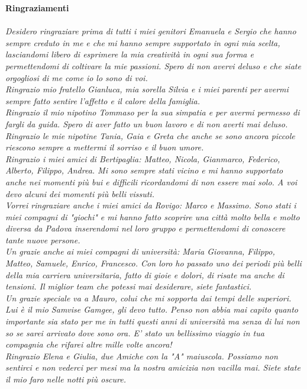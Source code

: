 \thispagestyle{empty}
\textbf{Ringraziamenti}\\\\
\textit{
Desidero ringraziare prima di tutti i miei genitori Emanuela e Sergio che hanno sempre creduto in me e che mi hanno sempre supportato in ogni mia scelta, lasciandomi libero di esprimere la mia creativit\`a in ogni sua forma e permettendomi di coltivare la mie passioni. Spero di non avervi deluso e che siate orgogliosi di me come io lo sono di voi.
\\
Ringrazio mio fratello Gianluca, mia sorella Silvia e i miei parenti per avermi sempre fatto sentire l'affetto e il calore della famiglia.
\\
Ringrazio il mio nipotino Tommaso per la sua simpatia e per avermi permesso di fargli da guida. Spero di aver fatto un buon lavoro e di non averti mai deluso. Ringrazio le mie nipotine Tania, Gaia e Greta che anche se sono ancora piccole riescono sempre a mettermi il sorriso e il buon umore.
\\
Ringrazio i miei amici di Bertipaglia: Matteo, Nicola, Gianmarco, Federico, Alberto, Filippo, Andrea. Mi sono sempre stati vicino e mi hanno supportato anche nei momenti pi\`u bui e difficili ricordandomi di non essere mai solo. A voi devo alcuni dei momenti pi\`u belli vissuti.
\\
Vorrei ringraziare anche i miei amici da Rovigo: Marco e Massimo. Sono stati i miei compagni di "giochi" e mi hanno fatto scoprire una citt\`a molto bella e molto diversa da Padova inserendomi nel loro gruppo e permettendomi di conoscere tante nuove persone.
\\
Un grazie anche ai miei compagni di universit\`a: Maria Giovanna, Filippo, Matteo, Samuele, Enrico, Francesco. Con loro ho passato uno dei periodi pi\`u belli della mia carriera universitaria, fatto di gioie e dolori, di risate ma anche di tensioni. Il miglior team che potessi mai desiderare, siete fantastici.
\\
Un grazie speciale va a Mauro, colui che mi sopporta dai tempi delle superiori. Lui \`e il mio Samvise Gamgee, gli devo tutto. Penso non abbia mai capito quanto importante sia stato per me in tutti questi anni di universit\`a ma senza di lui non so se sarei arrivato dove sono ora. E' stato un bellissimo viaggio in tua compagnia che rifarei altre mille volte ancora!
\\
Ringrazio Elena e Giulia, due Amiche con la "A" maiuscola. Possiamo non sentirci e non vederci per mesi ma la nostra amicizia non vacilla mai. Siete state il mio faro nelle notti pi\`u oscure.
}
